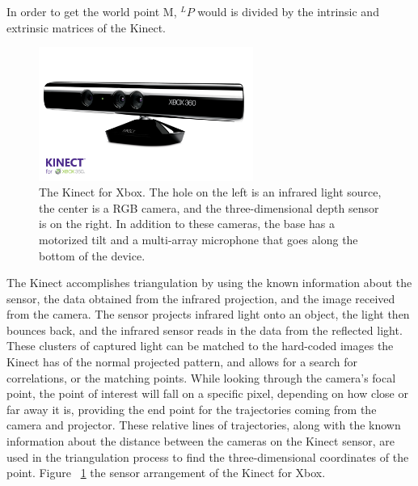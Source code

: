 \documentclass[pdftex,10.5pt]{report}
\begin{document}
\noindent In order to get the world point M, $^{L}P$ would is divided by the intrinsic and extrinsic matrices of the Kinect.

\begin{figure}[H]
	\centering
	\includegraphics[width=70mm]{figures/kinect.jpg}
	\caption{The Kinect for Xbox. The hole on the left is an infrared light source, the center is a RGB camera, and the three-dimensional depth sensor is on the right. In addition to these cameras, the base has a motorized tilt and a multi-array microphone that goes along the bottom of the device.}
	\label{kinectlable}
\end{figure}

The Kinect accomplishes triangulation by using the known information about the sensor, the data obtained from the infrared projection, and the image received from the camera. The sensor projects infrared light onto an object, the light then bounces back, and the infrared sensor reads in the data from the reflected light. These clusters of captured light can be matched to the hard-coded images the Kinect has of the normal projected pattern, and allows for a search for correlations, or the matching points. While looking through the camera's focal point, the point of interest will fall on a specific pixel, depending on how close or far away it is, providing the end point for the trajectories coming from the camera and projector. These relative lines of trajectories, along with the known information about the distance between the cameras on the Kinect sensor, are used in the triangulation process to find the three-dimensional coordinates of the point. Figure ~\ref{kinectlable} the sensor arrangement of the Kinect for Xbox.
\end{document}
